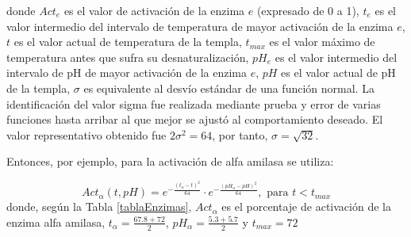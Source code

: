         \noindent donde $Act_e$ es el valor de activación de la enzima $e$ (expresado de 0 a 1), $t_e$ es el valor intermedio del intervalo de temperatura de mayor activación de la enzima $e$, $t$ es el valor actual de temperatura de la templa, $t_{max}$ es el valor máximo de temperatura antes que sufra su desnaturalización, $pH_e$ es el valor intermedio del intervalo de pH de mayor activación de la enzima $e$, $pH$ es el valor actual de pH de la templa, $\sigma$ es equivalente al desvío estándar de una función normal. La identificación del valor sigma fue realizada mediante prueba y error de varias funciones hasta arribar al que mejor se ajustó al comportamiento deseado. El valor representativo obtenido fue $2\sigma^2=64$, por tanto, $\sigma=\sqrt{32}$. 
        
        \par Entonces, por ejemplo, para la activación de alfa amilasa se utiliza:
        
        \begin{equation}
            Act_\alpha(t, pH) = e^{- \frac{(t_\alpha - t)^2}{64}} \cdot e^{- \frac{(pH_\alpha - pH)^2}{64}}, \text{ para } t< t_{max} 
        \end{equation}
        \noindent donde, según la Tabla \ref{tablaEnzimas}, $Act_\alpha$ es el porcentaje de activación de la enzima alfa amilasa, $t_\alpha = \frac{67.8 + 72}{2}$, $pH_\alpha = \frac{5.3 + 5.7}{2}$ y $t_{max} = 72$